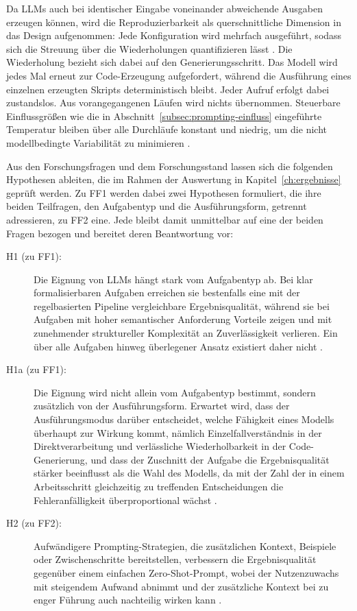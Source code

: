 Da \acp{LLM} auch bei identischer Eingabe voneinander abweichende Ausgaben erzeugen können, wird die Reproduzierbarkeit als querschnittliche Dimension in das Design aufgenommen: Jede Konfiguration wird mehrfach ausgeführt, sodass sich die Streuung über die Wiederholungen quantifizieren lässt \autocite{zhaoSurveyLargeLanguage2026,hassaniRoleChatGPTData2023}. Die Wiederholung bezieht sich dabei auf den Generierungsschritt. Das Modell wird jedes Mal erneut zur Code-Erzeugung aufgefordert, während die Ausführung eines einzelnen erzeugten Skripts deterministisch bleibt. Jeder Aufruf erfolgt dabei zustandslos. Aus vorangegangenen Läufen wird nichts übernommen. Steuerbare Einflussgrößen wie die in Abschnitt~\ref{subsec:prompting-einfluss} eingeführte Temperatur bleiben über alle Durchläufe konstant und niedrig, um die nicht modellbedingte Variabilität zu minimieren \autocite{schulhoffPromptReportSystematic2025,zhaoSurveyLargeLanguage2026}.

Aus den Forschungsfragen und dem Forschungsstand lassen sich die folgenden Hypothesen ableiten, die im Rahmen der Auswertung in Kapitel~\ref{ch:ergebnisse} geprüft werden. Zu FF1 werden dabei zwei Hypothesen formuliert, die ihre beiden Teilfragen, den Aufgabentyp und die Ausführungsform, getrennt adressieren, zu FF2 eine. Jede bleibt damit unmittelbar auf eine der beiden Fragen bezogen und bereitet deren Beantwortung vor:

\begin{description}
    \item[H1 (zu FF1):] Die Eignung von \acp{LLM} hängt stark vom Aufgabentyp ab. Bei klar formalisierbaren Aufgaben erreichen sie bestenfalls eine mit der regelbasierten Pipeline vergleichbare Ergebnisqualität, während sie bei Aufgaben mit hoher semantischer Anforderung Vorteile zeigen und mit zunehmender struktureller Komplexität an Zuverlässigkeit verlieren. Ein über alle Aufgaben hinweg überlegener Ansatz existiert daher nicht \autocite{hassaniRoleChatGPTData2023,coteDataCleaningMachine2024}.
    \item[H1a (zu FF1):] Die Eignung wird nicht allein vom Aufgabentyp bestimmt, sondern zusätzlich von der Ausführungsform. Erwartet wird, dass der Ausführungsmodus darüber entscheidet, welche Fähigkeit eines Modells überhaupt zur Wirkung kommt, nämlich Einzelfallverständnis in der Direktverarbeitung und verlässliche Wiederholbarkeit in der Code-Generierung, und dass der Zuschnitt der Aufgabe die Ergebnisqualität stärker beeinflusst als die Wahl des Modells, da mit der Zahl der in einem Arbeitsschritt gleichzeitig zu treffenden Entscheidungen die Fehleranfälligkeit überproportional wächst \autocite{khanCognitiveETLUsing2025,khanOverviewETLTechniques2024}.
    \item[H2 (zu FF2):] Aufwändigere Prompting-Strategien, die zusätzlichen Kontext, Beispiele oder Zwischenschritte bereitstellen, verbessern die Ergebnisqualität gegenüber einem einfachen Zero-Shot-Prompt, wobei der Nutzenzuwachs mit steigendem Aufwand abnimmt und der zusätzliche Kontext bei zu enger Führung auch nachteilig wirken kann \autocite{sahooSystematicSurveyPrompt,schulhoffPromptReportSystematic2025}.
\end{description}

